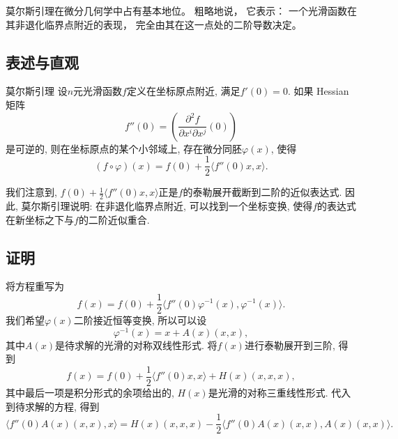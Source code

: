 
\begin{issues}
\issueTODO
\issueDraft
\end{issues}


莫尔斯引理在微分几何学中占有基本地位。 粗略地说， 它表示： 一个光滑函数在其非退化临界点附近的表现， 完全由其在这一点处的二阶导数决定。

\subsection{表述与直观}
\begin{lemma}{莫尔斯引理}
设$n$元光滑函数$f$定义在坐标原点附近, 满足$f'(0)=0$. 如果 Hessian 矩阵
$$
f''(0)=\left(\frac{\partial^2f}{\partial x^i\partial x^j}(0)\right)
$$
是可逆的, 则在坐标原点的某个小邻域上, 存在微分同胚$\varphi(x)$, 使得
$$
(f\circ\varphi)(x)=f(0)+\frac{1}{2}\langle f''(0)x,x\rangle.
$$
\end{lemma}

我们注意到, $f(0)+\frac{1}{2}\langle f''(0)x,x\rangle$正是$f$的泰勒展开截断到二阶的近似表达式. 因此, 莫尔斯引理说明: 在非退化临界点附近, 可以找到一个坐标变换, 使得$f$的表达式在新坐标之下与$f$的二阶近似重合.

\subsection{证明}
将方程重写为
$$
f(x)=f(0)+\frac{1}{2}\langle f''(0)\varphi^{-1}(x),\varphi^{-1}(x)\rangle.
$$
我们希望$\varphi(x)$二阶接近恒等变换, 所以可以设
$$
\varphi^{-1}(x)=x+A(x)(x,x),
$$
其中$A(x)$是待求解的光滑的对称双线性形式. 将$f(x)$进行泰勒展开到三阶, 得到
$$
f(x)=f(0)+\frac{1}{2}\langle f''(0)x,x\rangle+H(x)(x,x,x),
$$
其中最后一项是积分形式的余项给出的, $H(x)$是光滑的对称三重线性形式. 代入到待求解的方程, 得到
$$
\langle f''(0)A(x)(x,x),x\rangle
=H(x)(x,x,x)-\frac{1}{2}\langle f''(0)A(x)(x,x),A(x)(x,x)\rangle.
$$